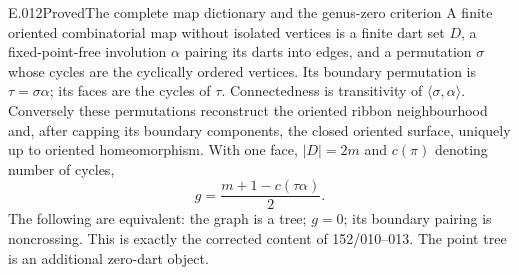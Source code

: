 \begin{saresult}{E.012}{Proved}{The complete map dictionary and the genus-zero criterion}
A finite oriented combinatorial map without isolated vertices is a finite
dart set $D$, a fixed-point-free involution $\alpha$ pairing its darts
into edges, and a permutation $\sigma$ whose cycles are the cyclically
ordered vertices. Its boundary permutation is
$\tau=\sigma\alpha$; its faces are the cycles of $\tau$.
Connectedness is transitivity of $\langle\sigma,\alpha\rangle$.
Conversely these permutations reconstruct the oriented ribbon
neighbourhood and, after capping its boundary components, the closed
oriented surface, uniquely up to oriented homeomorphism. With one face,
$|D|=2m$ and $c(\pi)$ denoting number of cycles,
\[
 g=\frac{m+1-c(\tau\alpha)}2.
\]
The following are equivalent: the graph is a tree; $g=0$; its boundary
pairing is noncrossing. This is exactly the corrected content of
152/010--013. The point tree is an additional zero-dart object.
\end{saresult}

